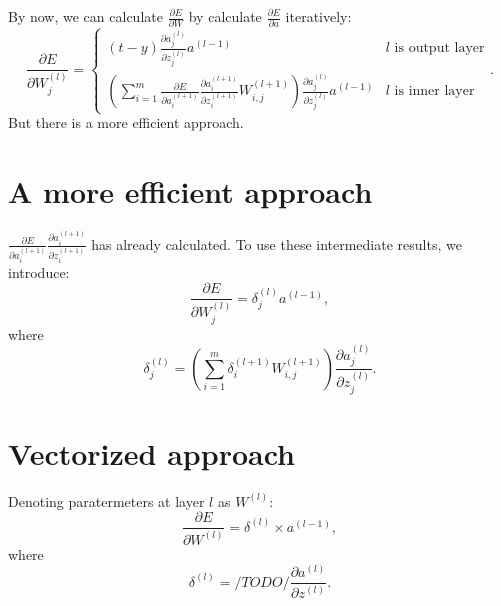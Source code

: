 By now, we can calculate $\frac{\partial E}{\partial W}$ by calculate $\frac{\partial E}{\partial a}$ iteratively:
\[
	\frac{\partial E}{\partial W_j^{(l)}} =
		\begin{cases}
			(t - y) \frac {\partial a_j^{(l)}} {\partial z_j^{(l)}} a^{(l-1)} & l \textrm{ is output layer} \\
			( \sum_{i=1}^{m}
				\frac{\partial E }{\partial a_i^{(l+1)}}
				\frac{\partial a_i^{(l+1)} }{\partial z_i^{(l+1)}}
				W_{i,j}^{(l+1)}
			)
			\frac {\partial a_j^{(l)}} {\partial z_j^{(l)}} a^{(l-1)} & l \textrm{ is inner layer}
		\end{cases}
	.
\]
But there is a more efficient approach.

\section{A more efficient approach}
$\frac{\partial E }{\partial a_i^{(l+1)}} \frac{\partial a_i^{(l+1)} }{\partial z_i^{(l+1)}}$ has already calculated.
To use these intermediate results, we introduce:
\[
	\frac{\partial E}{\partial W_j^{(l)}} = \delta_j^{(l)} a^{(l-1)},
\]
where
\[
	\delta_j^{(l)} = (\sum_{i=1}^{m} \delta_i^{(l+1)} W_{i,j}^{(l+1)})
		\frac{\partial a_j^{(l)} }{\partial z_j^{(l)}}
		.
\]

\section{Vectorized approach}
Denoting paratermeters at layer $l$ as $W^{(l)}$:
\[
	\frac{\partial E}{\partial W^{(l)}} = \delta^{(l)} \times a^{(l-1)},
\]
where
\[
	\delta^{(l)} = /TODO/
		\frac{\partial a^{(l)} }{\partial z^{(l)}}.
\]

